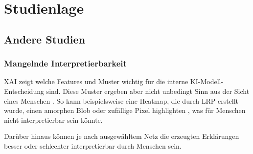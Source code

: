 \section{Studienlage}
\subsection{Andere Studien}
\subsubsection{Mangelnde Interpretierbarkeit}
XAI zeigt welche Features und Muster wichtig für die interne KI-Modell-Entscheidung sind. Diese Muster ergeben aber nicht unbedingt Sinn aus der Sicht eines Menschen \cite{Zednik2026}.  So kann beispielsweise eine Heatmap, die durch LRP erstellt wurde, einen amorphen Blob oder zufällige Pixel highlighten \cite{articleStopBlackBox}, was für Menschen nicht interpretierbar sein könnte.

Darüber hinaus können je nach ausgewähltem Netz die erzeugten Erklärungen besser oder schlechter interpretierbar durch Menschen sein\cite{Zednik2026}.
